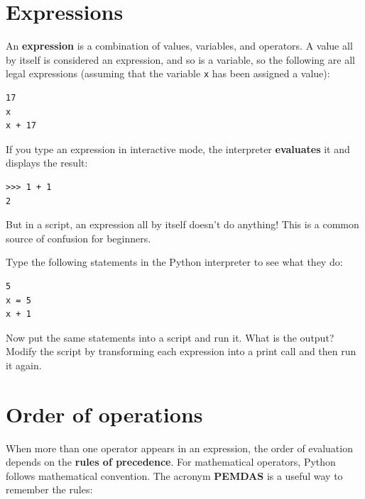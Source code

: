 \documentclass[10pt]{book}
\begin{document}
\section{Expressions}

An {\bf expression} is a combination of values, variables, and operators.
A value all by itself is considered an expression, and so is
a variable, so the following are all legal expressions
(assuming that the variable {\tt x} has been assigned a value):


\beforeverb
\begin{verbatim}
17
x
x + 17
\end{verbatim}
\afterverb
%
If you type an expression in interactive mode, the interpreter
{\bf evaluates} it and displays the result:

\beforeverb
\begin{verbatim}
>>> 1 + 1
2
\end{verbatim}
\afterverb
%
But in a script, an expression all by itself doesn't
do anything!  This is a common
source of confusion for beginners.

\begin{ex}
Type the following statements in the Python interpreter to see
what they do:

\beforeverb
\begin{verbatim}
5
x = 5
x + 1
\end{verbatim}
\afterverb
%
Now put the same statements into a script and run it.  What
is the output?  Modify the script by transforming each
expression into a print call and then run it again.
\end{ex}


\section{Order of operations}

When more than one operator appears in an expression, the order of
evaluation depends on the {\bf rules of precedence}.  For
mathematical operators, Python follows mathematical convention.
The acronym {\bf PEMDAS} is a useful way to
remember the rules:

\end{document}
